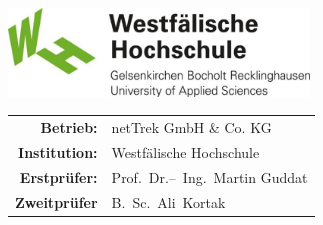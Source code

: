 \begin{titlepage}
    \maketitle
    \vspace*{\fill}
    \begin{flushleft}
        
    \end{flushleft}
    \vspace{1cm}
    \begin{flushright}
        \includegraphics[width={0.6\textwidth}]{../assets/img/logos/whs}
    \end{flushright}
    \vspace*{\fill}
    \begin{large}
        \begin{tabular}{r l}
            \textbf{Betrieb:}     & netTrek GmbH \& Co. KG         \\
            \textbf{Institution:} & Westfälische Hochschule        \\
            \textbf{Erstprüfer:}  & Prof.~Dr.--~Ing.~Martin Guddat \\
            \textbf{Zweitprüfer}  & B.~Sc.~Ali~Kortak              \\
        \end{tabular}
    \end{large}
\end{titlepage}